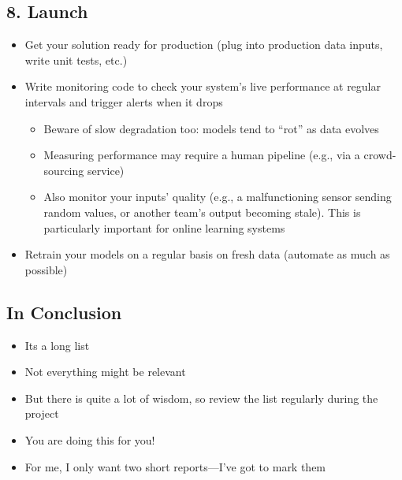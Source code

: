 \begin{slide}
\section[-2]{8. Launch}

\begin{PauseHighLight}\squeeze
  \begin{itemize}
  \item Get your solution ready for production (plug into production
    data inputs, write unit tests, etc.)\pause
  \item Write monitoring code to check your system’s live performance
    at regular intervals and trigger alerts when it drops
    \begin{itemize}
    \item Beware of slow degradation too: models tend to “rot” as data
      evolves
    \item Measuring performance may require a human pipeline (e.g.,
      via a crowd-sourcing service)
    \item Also monitor your inputs’ quality (e.g., a malfunctioning
      sensor sending random values, or another team’s output
      becoming stale). This is particularly important for online
      learning systems\pause
    \end{itemize}
  \item Retrain your models on a regular basis on fresh data (automate
    as much as possible)\pause
  \end{itemize}
\end{PauseHighLight}

\end{slide}


\begin{slide}
  \section{In Conclusion}

\begin{PauseHighLight}
  \begin{itemize}
  \item Its a long list\pause
  \item Not everything might be relevant\pause
  \item But there is quite a lot of wisdom, so review the list
    regularly during the project\pause
  \item You are doing this for you!\pause
  \item For me, I only want two short reports\pauseb---I've got to
    mark them\pauseb
  \end{itemize}
\end{PauseHighLight}


\end{slide}
